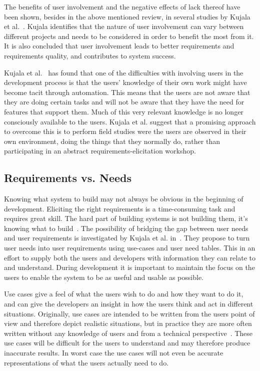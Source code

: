 \documentclass[a4paper]{report}
\begin{document}
The benefits of user involvement and the negative effects of lack thereof have been shown, besides in the above mentioned review, in several studies by Kujala et al.~\cite{Kujala:2008,Kujala-et-al:2005,Kujala:2003}. Kujala identifies that the nature of user involvement can vary between different projects and needs to be considered in order to benefit the most from it. It is also concluded that user involvement leads to better requirements and requirements quality, and contributes to system success.

Kujala et al.~\cite{Kujala-et-al:2005} has found that one of the difficulties with involving users in the development process is that the users' knowledge of their own work might have become tacit through automation. This means that the users are not aware that they are doing certain tasks and will not be aware that they have the need for features that support them. Much of this very relevant knowledge is no longer consciously available to the users. Kujala et al. suggest that a promising approach to overcome this is to perform field studies were the users are observed in their own environment, doing the things that they normally do, rather than participating in an abstract requirements-elicitation workshop.

\subsection{Requirements vs. Needs}
Knowing what system to build may not always be obvious in the beginning of development. Eliciting the right requirements is a time-consuming task and requires great skill. The hard part of building systems is not building them, it’s knowing what to build~\cite{Armour:2000}. The possibility of bridging the gap between user needs and user requirements is investigated by Kujala et al. in~\cite{Kujala-et-al:2001}. They propose to turn user needs into user requirements using use-cases and user need tables. This in an effort to supply both the users and developers with information they can relate to and understand. During development it is important to maintain the focus on the users to enable the system to be as useful and usable as possible.

Use cases give a feel of what the users wish to do and how they want to do it, and can give the developers an insight in how the users think and act in different situations. Originally, use cases are intended to be written from the users point of view and therefore depict realistic situations, but in practice they are more often written without any knowledge of users and from a technical perspective~\cite{Kujala-et-al:2001}. These use cases will be difficult for the users to understand and may therefore produce inaccurate results. In worst case the use cases will not even be accurate representations of what the users actually need to do.
\end{document}
